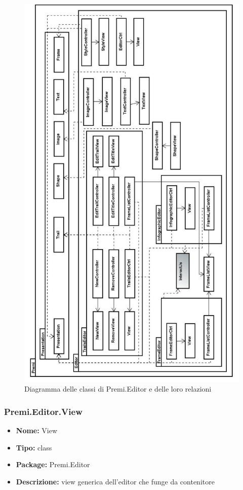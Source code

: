 \begin{figure}[h!]
\begin{center}
\includegraphics[scale=0.40]{img/diapkg/vecchi/dettaglio_editor_presentation.jpg}
\caption{Diagramma delle classi di Premi.Editor e delle loro relazioni}
\end{center}
\end{figure}
\clearpage

\subsubsection{Premi.Editor.View}
\begin{itemize}
  \item \textbf{Nome:} View
  \item \textbf{Tipo:} class
  \item \textbf{Package:} Premi.Editor
  \item \textbf{Descrizione:} view generica dell'editor che funge da contenitore
\end{itemize}
